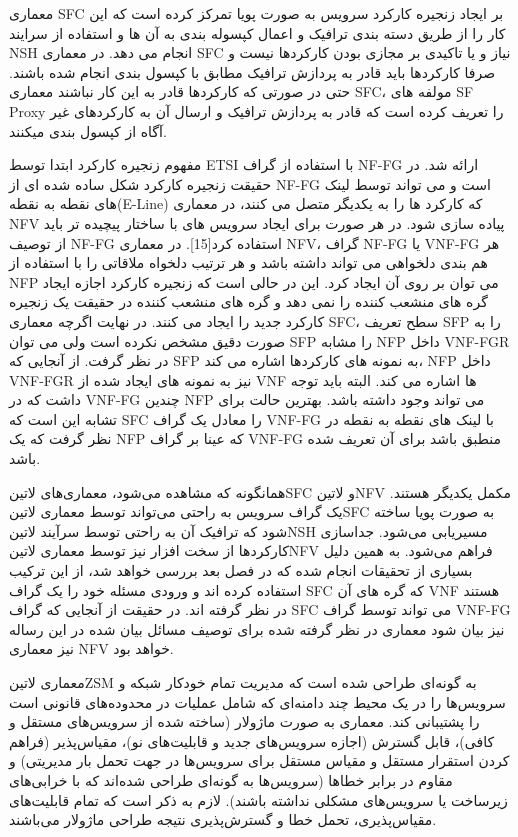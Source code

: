 معماری SFC بر ایجاد زنجیره کارکرد سرویس به صورت پویا تمرکز کرده است که این کار را از طریق دسته بندی ترافیک و اعمال کپسوله بندی به آن ها و استفاده از سرایند NSH انجام می دهد. در معماری SFC نیاز و یا تاکیدی بر مجازی بودن کارکردها نیست و صرفا کارکردها باید قادر به پردازش ترافیک مطابق با کپسول بندی انجام شده باشند. حتی در صورتی که کارکردها قادر به این کار نباشند معماری SFC، مولفه های SF Proxy را تعریف کرده است که قادر به پردازش ترافیک و ارسال آن به کارکردهای غیر آگاه از کپسول بندی میکنند.

مفهوم زنجیره کارکرد ابتدا توسط ETSI با استفاده از گراف NF-FG ارائه شد. در حقیقت زنجیره کارکرد شکل ساده شده ای از NF-FG است و می تواند توسط لینک های نقطه به نقطه(E-Line) که کارکرد ها را به یکدیگر متصل می کنند، در معماری NFV پیاده سازی شود. در هر صورت برای ایجاد سرویس های با ساختار پیچیده تر باید از توصیف NF-FG استفاده کرد[15]. در معماری NFV، گراف NF-FG یا VNF-FG هر هم بندی دلخواهی می تواند داشته باشد و هر ترتیب دلخواه ملاقاتی را با استفاده از NFP می توان بر روی آن ایجاد کرد. این در حالی است که زنجیره کارکرد اجازه ایجاد گره های منشعب کننده را نمی دهد و گره های منشعب کننده در حقیقت یک زنجیره کارکرد جدید را ایجاد می کنند. در نهایت اگرچه معماری SFC، سطح تعریف SFP را به صورت دقیق مشخص نکرده است ولی می توان SFP را مشابه NFP داخل VNF-FGR در نظر گرفت. از آنجایی که SFP به نمونه های کارکردها اشاره می کند، NFP داخل VNF-FGR نیز به نمونه های ایجاد شده از VNF ها اشاره می کند. البته باید توجه داشت که در VNF-FG چندین NFP می تواند وجود داشته باشد. بهترین حالت برای تشابه این است که SFC را معادل یک گراف VNF-FG با لینک های نقطه به نقطه در نظر گرفت که یک NFP که عینا بر گراف VNF-FG منطبق باشد برای آن تعریف شده باشد.

همانگونه که مشاهده می‌شود، معماری‌های ‌لاتین{SFC}
و ‌لاتین{NFV} مکمل یکدیگر هستند.
یک گراف سرویس به راحتی می‌تواند توسط معماری ‌لاتین{SFC} به صورت پویا ساخته شود
که ترافیک آن به راحتی توسط سرآیند ‌لاتین{NSH} مسیریابی می‌شود.
جداسازی کارکردها از سخت افزار نیز توسط معماری ‌لاتین{NFV} فراهم می‌شود.
به همین دلیل بسیاری از تحقیقات انجام شده که در فصل بعد بررسی خواهد شد، از این ترکیب استفاده کرده اند و ورودی مسئله خود را یک گراف SFC که گره های آن VNF هستند در نظر گرفته اند. در حقیقت از آنجایی که گراف SFC می تواند توسط گراف VNF-FG نیز بیان شود معماری در نظر گرفته شده برای توصیف مسائل بیان شده در این رساله نیز معماری NFV خواهد بود.


معماری ‌لاتین{ZSM} به گونه‌ای طراحی شده است که مدیریت تمام خودکار شبکه و سرویس‌ها را در یک محیط چند دامنه‌ای که شامل عملیات در محدوده‌های قانونی است را پشتیبانی کند.
معماری به صورت ماژولار (ساخته شده از سرویس‌های مستقل و کافی)، قابل گسترش (اجازه سرویس‌های جدید و قابلیت‌های نو)، مقیاس‌پذیر (فراهم کردن استقرار مستقل و مقیاس مستقل برای سرویس‌ها در جهت تحمل بار مدیریتی)
و مقاوم در برابر خطاها (سرویس‌ها به گونه‌ای طراحی شده‌اند که با خرابی‌های زیرساخت یا سرویس‌های مشکلی نداشته باشند).
لازم به ذکر است که تمام قابلیت‌های مقیاس‌پذیری، تحمل خطا و گسترش‌پذیری نتیجه طراحی ماژولار می‌باشند.

